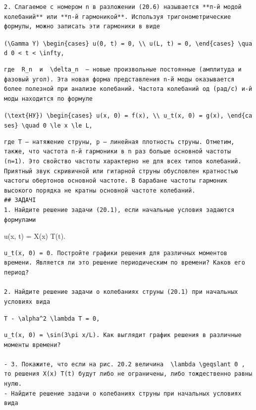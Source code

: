 \documentclass[
  ukrainian,
]{article}
\begin{document}
\begin{verbatim}
2. Слагаемое с номером n в разложении (20.6) называется **п-й модой колебаний** или **п-й гармоникой**. Используя тригонометрические формулы, можно записать эти гармоники в виде
\end{verbatim}

\texttt{(\textbackslash{}Gamma\ Y)\ \textbackslash{}begin\{cases\}\ u(0,\ t)\ =\ 0,\ \textbackslash{}\textbackslash{}\ u(L,\ t)\ =\ 0,\ \textbackslash{}end\{cases\}\ \textbackslash{}quad\ 0\ \textless{}\ t\ \textless{}\ \textbackslash{}infty,}

\begin{verbatim}
где  R_n  и  \delta_n  — новые произвольные постоянные (амплитуда и фазовый угол). Эта новая форма представления n-й моды оказывается более полезной при анализе колебаний. Частота колебаний од (рад/с) и-й моды находится по формуле
\end{verbatim}

\texttt{(\textbackslash{}text\{НУ\})\ \textbackslash{}begin\{cases\}\ u(x,\ 0)\ =\ f(x),\ \textbackslash{}\textbackslash{}\ u\_t(x,\ 0)\ =\ g(x),\ \textbackslash{}end\{cases\}\ \textbackslash{}quad\ 0\ \textbackslash{}le\ x\ \textbackslash{}le\ L,}

\begin{verbatim}
где Т — натяжение струны, р — линейная плотность струны. Отметим, также, что частота n-й гармоники в n раз больше основной частоты (n=1). Это свойство частоты характерно не для всех типов колебаний. Приятный звук скривичной или гитарной струны обусловлен кратностью частогы обертонов основной частоте. В барабане частоты гармоник высокого порядка не кратны основной частоте колебаний.
## ЗАДАЧІ
1. Найдите решение задачи (20.1), если начальные условия задаются формулами
\end{verbatim}

u(x, t) = X(x) T(t).

\begin{verbatim}
u_t(x, 0) = 0. Постройте графики решения для различных моментов времени. Является ли это решение периодическим по времени? Каков его период?

2. Найдите решение задачи о колебаниях струны (20.1) при начальных условиях вида
\end{verbatim}

\texttt{T\textquotesingle{}\textquotesingle{}\ -\ \textbackslash{}alpha\^{}2\ \textbackslash{}lambda\ T\ =\ 0,}

\begin{verbatim}
u_t(x, 0) = \sin(3\pi x/L). Как выглядит график решения в различные моменты времени?

- 3. Покажите, что если на рис. 20.2 величина  \lambda \geqslant 0 , то решения X(x) T(t) будут либо не ограничены, либо тождественно равны нулю.
- Найдите решение задачи о колебаниях струны при начальных условиях вида
\end{verbatim}
\end{document}
